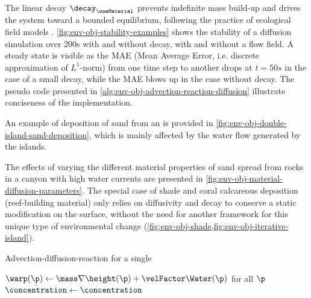 The linear decay $\decay_\oneMaterial$ prevents indefinite mass build-up and drives the system toward a bounded equilibrium, following the practice of ecological field models \cite{Seidl2012}. \cref{fig:env-obj-stability-examples} shows the stability of a diffusion simulation over 200s with and without decay, with and without a flow field. A steady state is visible as the MAE (Mean Average Error, i.e. discrete approximation of $L^1$-norm) from one time step to another drops at $t=50s$ in the case of a small decay, while the MAE blows up in the case without decay. The pseudo code presented in \cref{alg:env-obj-advection-reaction-diffusion} illustrate conciseness of the implementation.


An example of deposition of sand from an  is provided in \cref{fig:env-obj-double-island-sand-deposition}, which is mainly affected by the water flow generated by the islands.

The effects of varying the different material properties of sand spread from rocks in a canyon with high water currents are presented in \cref{fig:env-obj-material-diffusion-parameters}. The special case of shade and coral calcareous deposition (reef-building material) only relies on diffusivity and decay to conserve a static modification on the surface, without the need for another framework for this unique type of environmental change (\cref{fig:env-obj-shade,fig:env-obj-iterative-island}).

\begin{algorithm}%
    \DontPrintSemicolon
    \caption{Advection-diffusion-reaction for a single }
    \label{alg:env-obj-advection-reaction-diffusion}
    \BlankLine
    $\warp(\p) \gets \mass \nabla \height(\p) + \velFactor \Water(\p)$ for all $\p$\;
    $\hat{\concentration} \gets \concentration$\;
    \Return{$\hat{\concentration}$}
\end{algorithm}

